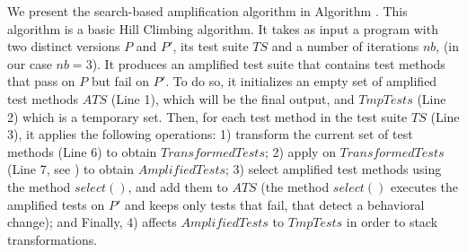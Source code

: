 We present the search-based amplification algorithm in Algorithm .
This algorithm is a basic Hill Climbing algorithm.
It takes as input a program with two distinct versions $P$ and $P'$, its test suite $TS$ and a number of iterations $nb$, (in our case $nb=3$).
It produces an amplified test suite that contains test methods that pass on $P$ but fail on $P'$.
To do so, it initializes an empty set of amplified test methods $ATS$ (Line 1), which will be the final output, and $TmpTests$ (Line 2) which is a temporary set.
Then, for each test method in the test suite $TS$ (Line 3), it applies the following operations: 
1) transform the current set of test methods (Line 6) to obtain $TransformedTests$;
2) apply \aampl on $TransformedTests$ (Line 7, see ) to obtain $AmplifiedTests$; 
3) select amplified test methods using the method $select()$, and add them to $ATS$ 
(the method $select()$ executes the amplified tests on $P'$ and keeps only tests that fail, \ie that detect a behavioral change);
and Finally, 4) affects $AmplifiedTests$ to $TmpTests$ in order to stack transformations.

